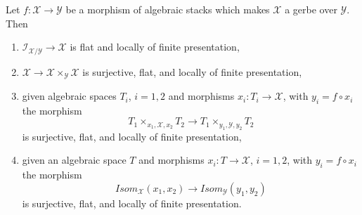 \begin{lemma}
\label{lemma-gerbe-isom-fppf}
Let $f : \mathcal{X} \to \mathcal{Y}$ be a morphism of algebraic stacks
which makes $\mathcal{X}$ a gerbe over $\mathcal{Y}$. Then
\begin{enumerate}
\item $\mathcal{I}_{\mathcal{X}/\mathcal{Y}} \to \mathcal{X}$
is flat and locally of finite presentation,
\item $\mathcal{X} \to \mathcal{X} \times_\mathcal{Y} \mathcal{X}$
is surjective, flat, and locally of finite presentation,
\item given algebraic spaces $T_i$, $i = 1, 2$ and morphisms
$x_i : T_i \to \mathcal{X}$, with $y_i = f \circ x_i$ the morphism
$$
T_1 \times_{x_1, \mathcal{X}, x_2} T_2 \longrightarrow
T_1 \times_{y_1, \mathcal{Y}, y_2} T_2
$$
is surjective, flat, and locally of finite presentation,
\item given an algebraic space $T$ and morphisms
$x_i : T \to \mathcal{X}$, $i = 1, 2$, with $y_i = f \circ x_i$ the morphism
$$
\mathit{Isom}_\mathcal{X}(x_1, x_2) \longrightarrow
\mathit{Isom}_\mathcal{Y}(y_1, y_2)
$$
is surjective, flat, and locally of finite presentation.
\end{enumerate}
\end{lemma}

